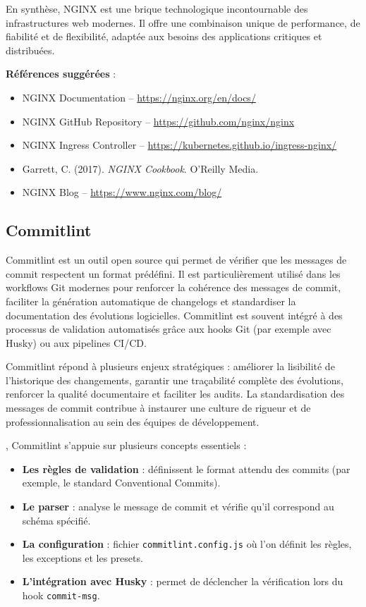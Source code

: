 En synthèse, NGINX est une brique technologique incontournable des infrastructures web modernes. Il offre une combinaison unique de performance, de fiabilité et de flexibilité, adaptée aux besoins des applications critiques et distribuées.

\textbf{Références suggérées} :
\begin{itemize}
	\item NGINX Documentation – \url{https://nginx.org/en/docs/}
	\item NGINX GitHub Repository – \url{https://github.com/nginx/nginx}
	\item NGINX Ingress Controller – \url{https://kubernetes.github.io/ingress-nginx/}
	\item Garrett, C. (2017). \textit{NGINX Cookbook}. O’Reilly Media.
	\item NGINX Blog – \url{https://www.nginx.com/blog/}
\end{itemize}


\subsection{Commitlint}

Commitlint est un outil open source qui permet de vérifier que les messages de commit respectent un format prédéfini. Il est particulièrement utilisé dans les workflows Git modernes pour renforcer la cohérence des messages de commit, faciliter la génération automatique de changelogs et standardiser la documentation des évolutions logicielles. Commitlint est souvent intégré à des processus de validation automatisés grâce aux hooks Git (par exemple avec Husky) ou aux pipelines CI/CD.

 Commitlint répond à plusieurs enjeux stratégiques  : améliorer la lisibilité de l’historique des changements, garantir une traçabilité complète des évolutions, renforcer la qualité documentaire et faciliter les audits. La standardisation des messages de commit contribue à instaurer une culture de rigueur et de professionnalisation au sein des équipes de développement.

, Commitlint s’appuie sur plusieurs concepts essentiels  :
\begin{itemize}
	\item \textbf{Les règles de validation}  : définissent le format attendu des commits (par exemple, le standard Conventional Commits).
	\item \textbf{Le parser}  : analyse le message de commit et vérifie qu’il correspond au schéma spécifié.
	\item \textbf{La configuration}  : fichier \texttt{commitlint.config.js} où l’on définit les règles, les exceptions et les presets.
	\item \textbf{L’intégration avec Husky}  : permet de déclencher la vérification lors du hook \texttt{commit-msg}.
\end{itemize}

